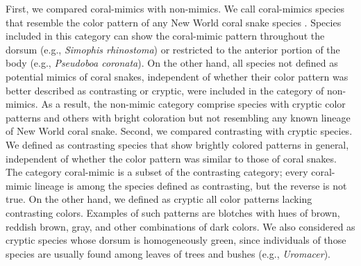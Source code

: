 First, we compared coral-mimics with non-mimics. We call coral-mimics species that resemble the color pattern of any New World coral snake species \citep[see][]{roze_1996, campbell_lamar_2004}. Species included in this category can show the coral-mimic pattern throughout the dorsum (e.g., \textit{Simophis rhinostoma}) or restricted to the anterior portion of the body (e.g., \textit{Pseudoboa coronata}). On the other hand, all species not defined as potential mimics of coral snakes, independent of whether their color pattern was better described as contrasting or cryptic, were included in the category of non-mimics. As a result, the non-mimic category comprise species with cryptic color patterns and others with bright coloration but not resembling any known lineage of New World coral snake. Second, we compared contrasting with cryptic species. We defined as contrasting species that show brightly colored patterns in general, independent of whether the color pattern was similar to those of coral snakes. The category coral-mimic is a subset of the contrasting category; every coral-mimic lineage is among the species defined as contrasting, but the reverse is not true. On the other hand, we defined as cryptic all color patterns lacking contrasting colors. Examples of such patterns are blotches with hues of brown, reddish brown, gray, and other combinations of dark colors. We also considered as cryptic species whose dorsum is homogeneously green, since individuals of those species are usually found among leaves of trees and bushes (e.g., \textit{Uromacer}).

